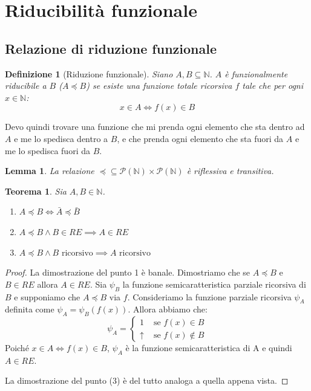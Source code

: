 \documentclass[a4paper,titlepage]{article}
\newtheorem{theorem}{Teorema}[section]
\newtheorem{lemma}{Lemma}[section]
\newtheorem{definition}{Definizione}[section]
\theoremstyle{definition}
\newcommand{\N}{\mathbb{N}}
\begin{document}
\section{Riducibilità funzionale}
\subsection{Relazione di riduzione funzionale}
\begin{definition}[Riduzione funzionale]
	Siano $A,B\subseteq\N$. $A$ è funzionalmente riducibile a $B$ ($A\preceq B$) se esiste una funzione totale ricorsiva $f$ tale che per ogni $x\in\N$: 
	\[
		x\in A \iff f(x)\in B
	\]
\end{definition}

Devo quindi trovare una funzione che mi prenda ogni elemento che sta dentro ad $A$ e me lo spedisca dentro a $B$, e che prenda ogni elemento che sta fuori da $A$ e me lo spedisca fuori da $B$.

\begin{lemma}
	La relazione $\preceq\subseteq \mathcal P(\N)\times\mathcal P(\N)$ è riflessiva e transitiva. 
\end{lemma}

\begin{theorem}
	Sia $A,B\in\N$.
	\begin{enumerate}[(1)]
		\item $A\preceq B\iff\bar A\preceq\bar B$
		\item $A\preceq B\land B\in RE\implies A\in RE$
		\item $A\preceq B\land B\text{ ricorsivo}\implies A\text{ ricorsivo}$	
	\end{enumerate}
\end{theorem}
\begin{proof}
	La dimostrazione del punto 1 è banale. Dimostriamo che se $A\preceq B$ e $B\in RE$ allora $A\in RE$. Sia $\psi_B$ la funzione semicaratteristica parziale ricorsiva di $B$ e supponiamo che $A\preceq B$ via $f$. Consideriamo la funzione parziale ricorsiva $\psi_A$ definita come $\psi_A=\psi_B(f(x))$. Allora abbiamo che:
	\[
		\psi_A =
		\begin{cases}
			1 			   &\text{ se } f(x)\in B\\
			\uparrow  &\text{ se } f(x)\notin B
		\end{cases}
	\]
	Poiché $x\in A\iff f(x)\in B$, $\psi_A$ è la funzione semicaratteristica di A e quindi $A\in RE$.
	
	La dimostrazione del punto (3) è del tutto analoga a quella appena vista. 
\end{proof}
\end{document}
